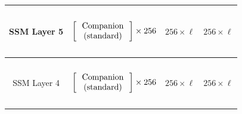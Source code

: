 \begin{table}[]
\begin{tabular}{@{}c|c|c|c@{}}
SSM Layer 5 & \begin{math}\begin{aligned}    \begin{matrix}    \text{\phantom{-}} \\    \end{matrix}    \\    \begin{bmatrix}    \text{\phantom{-} Companion \phantom{-}}   \\ \text{(standard)} \\    \end{bmatrix}    \times 256     \\    \begin{matrix}    \text{\phantom{-}} \\    \end{matrix}    \\\end{aligned}\end{math} & $256 \times \ell$                       & $256 \times \ell$                       \\ \midrule
SSM Layer 4 & \begin{math}\begin{aligned}    \begin{matrix}    \text{\phantom{-}} \\    \end{matrix}    \\    \begin{bmatrix}    \text{\phantom{-} Companion \phantom{-}}   \\ \text{(standard)} \\    \end{bmatrix}    \times 256     \\    \begin{matrix}    \text{\phantom{-}} \\    \end{matrix}    \\\end{aligned}\end{math} & $256 \times \ell$                       & $256 \times \ell$                       \\ \midrule

\end{tabular}
\end{table}
